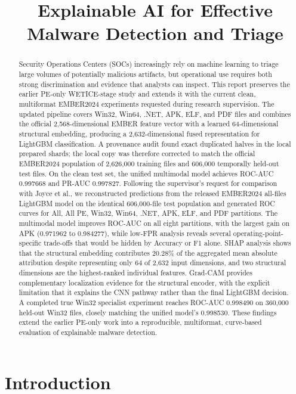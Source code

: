 \documentclass[conference]{IEEEtran}
\title{Explainable AI for Effective Malware Detection and Triage}
\author{\IEEEauthorblockN{Ananta Prasad Gaire, Aleksandar Shurbevski, Shozo Naito}

\IEEEauthorblockA{The Kyoto College of Graduate Studies for Informatics (KCGI)\\
Kyoto, Japan\\
Emails: st212678@m2.kcg.edu, a\_shurbevski@kcg.edu, s\_naito@kcg.edu}}
\begin{document}
\maketitle
\begin{abstract}
Security Operations Centers (SOCs) increasingly rely on machine learning to triage large volumes of potentially malicious artifacts, but operational use requires both strong discrimination and evidence that analysts can inspect. This report preserves the earlier PE-only WETICE-stage study and extends it with the current clean, multiformat EMBER2024 experiments requested during research supervision. The updated pipeline covers Win32, Win64, .NET, APK, ELF, and PDF files and combines the official 2,568-dimensional EMBER feature vector with a learned 64-dimensional structural embedding, producing a 2,632-dimensional fused representation for LightGBM classification. A provenance audit found exact duplicated halves in the local prepared shards; the local copy was therefore corrected to match the official EMBER2024 population of 2,626,000 training files and 606,000 temporally held-out test files. On the clean test set, the unified multimodal model achieves ROC-AUC 0.997668 and PR-AUC 0.997827. Following the supervisor's request for comparison with Joyce et al., we reconstructed predictions from the released EMBER2024 all-files LightGBM model on the identical 606,000-file test population and generated ROC curves for All, All PE, Win32, Win64, .NET, APK, ELF, and PDF partitions. The multimodal model improves ROC-AUC on all eight partitions, with the largest gain on APK (0.971962 to 0.984277), while low-FPR analysis reveals several operating-point-specific trade-offs that would be hidden by Accuracy or F1 alone. SHAP analysis shows that the structural embedding contributes 20.28\% of the aggregated mean absolute attribution despite representing only 64 of 2,632 input dimensions, and two structural dimensions are the highest-ranked individual features. Grad-CAM provides complementary localization evidence for the structural encoder, with the explicit limitation that it explains the CNN pathway rather than the final LightGBM decision. A completed true Win32 specialist experiment reaches ROC-AUC 0.998490 on 360,000 held-out Win32 files, closely matching the unified model's 0.998530. These findings extend the earlier PE-only work into a reproducible, multiformat, curve-based evaluation of explainable malware detection.
\end{abstract}

\section{Introduction}
\label{section:introduction}
\end{document}
